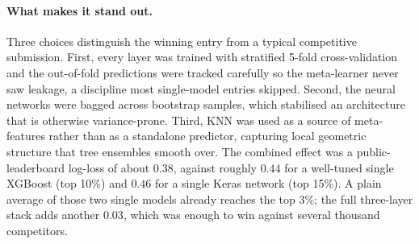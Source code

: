 \paragraph{What makes it stand out.} Three choices distinguish the winning entry from a typical competitive submission. First, every layer was trained with stratified 5-fold cross-validation and the out-of-fold predictions were tracked carefully so the meta-learner never saw leakage, a discipline most single-model entries skipped. Second, the neural networks were bagged across bootstrap samples, which stabilised an architecture that is otherwise variance-prone. Third, KNN was used as a source of meta-features rather than as a standalone predictor, capturing local geometric structure that tree ensembles smooth over. The combined effect was a public-leaderboard log-loss of about $0.38$, against roughly $0.44$ for a well-tuned single XGBoost (top 10\%) and $0.46$ for a single Keras network (top 15\%). A plain average of those two single models already reaches the top 3\%; the full three-layer stack adds another $0.03$, which was enough to win against several thousand competitors.
